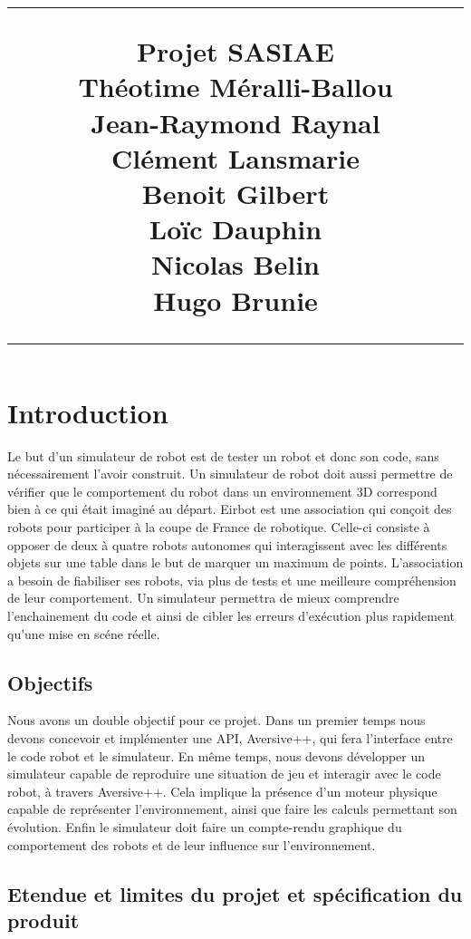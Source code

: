 \documentclass{scrreprt}
\title{
\flushright
\rule{16cm}{5pt}
\vskip1cm
{\Huge Projet SASIAE}\\
\vspace{10cm}
{\small Théotime Méralli-Ballou\\ Jean-Raymond Raynal\\ Clément Lansmarie\\ Benoit Gilbert\\ Loïc Dauphin\\ Nicolas Belin\\ Hugo Brunie\\ }
\vfill
\rule{16cm}{5pt}
}
\date{}
\begin{document}
\maketitle
\tableofcontents

\chapter{Introduction}
Le but d'un simulateur de robot est de tester un robot et donc son code, sans nécessairement l'avoir construit. Un simulateur de robot doit aussi permettre de vérifier que le comportement du robot dans un environnement 3D correspond bien à ce qui était imaginé au départ. Eirbot est une association qui conçoit des robots pour participer à la coupe de France de robotique. Celle-ci consiste à opposer de deux à quatre robots autonomes qui interagissent avec les différents objets sur une table dans le but de marquer un maximum de points. L'association a besoin de fiabiliser ses robots, via plus de tests et une meilleure compréhension de leur comportement. Un simulateur permettra de mieux comprendre l'enchainement du code et ainsi de cibler les erreurs d'exécution plus rapidement qu'une mise en scéne réelle.



\section{Objectifs}

Nous avons un double objectif pour ce projet. Dans un premier temps nous devons concevoir et implémenter une API, Aversive++, qui fera l'interface entre le code robot et le simulateur. En même temps, nous devons développer un simulateur capable de reproduire une situation de jeu et interagir avec le code robot, à travers Aversive++. Cela implique la présence d'un moteur physique capable de représenter l'environnement, ainsi que faire les calculs permettant son évolution. Enfin le simulateur doit faire un compte-rendu graphique du comportement des robots et de leur influence sur l'environnement.


\section{Etendue et limites du projet et spécification du produit}
\end{document}

